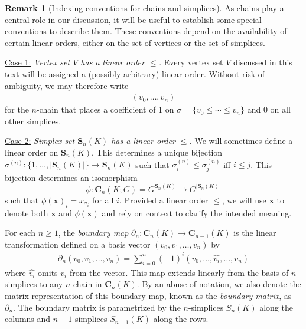 \documentclass[utf8]{formatting_stuff/frontiersFPHY}
\newcommand{\Chains}{\mathbf{C}}
\newcommand{\Simplices}[0]{\mathbf{S}}
\newcommand{\optimalrep}{\mathbf{x}}
\newcommand{\orepentry}{x}
\newcommand{\dimss}[1]{^{(#1)}}
\theoremstyle{plain}
\theoremstyle{definition}
\newtheorem{remark}[theorem]{Remark}
\begin{document}
\begin{remark}[{Indexing conventions for chains and simplices}]
\label{rmk:indexingchains}
As chains play a central role in our discussion, it will be useful to establish some special conventions to describe them.  These conventions depend on the availability of certain linear orders, either on the set of vertices or the set of simplices.

\noindent \underline{Case 1:} \emph{Vertex set $V$ has a linear order $\le$. }  Every vertex set $V$ discussed in this text will be assigned a (possibly arbitrary) linear order.  Without  risk of ambiguity, we may therefore write
    \begin{align*}
        (v_0, \ldots, v_n)
    \end{align*}
for the $n$-chain that places a coefficient of 1 on $\sigma = \{v_0 \leq \cdots \leq v_n\}$ and 0 on all other simplices. 

\noindent \underline{Case 2:} \emph{Simplex set $\Simplices_n(K)$ has a linear order $\le$.}  We will sometimes define a linear order on $\Simplices_n(K)$.  This determines a unique bijection  $\sigma \dimss{n}: \{1, \ldots, |\Simplices_n(K)|\} \to  \Simplices_n(K)$ such that $\sigma_i\dimss{n} \le \sigma_j\dimss{n}$ iff $i \le j$.  This bijection determines an isomorphism
    $$
        \phi: 
        \Chains_n(K;G) = G^{\Simplices_n(K)}
        \to
        G^{|\Simplices_n(K)|}
    $$
such that $\phi(\optimalrep)_i = \orepentry_{\sigma_i}$ for all $i$.  
Provided a linear order $\le$,  we will use $\optimalrep$ to denote both $\optimalrep$ and $\phi(\optimalrep)$ and rely on context to clarify the  intended meaning.
\end{remark}


  

For each $n\geq 1$, the \textit{boundary map} $\partial_n: \Chains_n(K) \rightarrow \Chains_{n-1}(K)$ is the linear transformation defined on a basis vector  $(v_0, v_1, \ldots, v_n)$ by 
    \begin{align*}
    \textstyle
        \partial_n(v_0, v_1, \ldots, v_n) = \sum_{i=0}^n (-1)^i (v_0, \ldots, \hat{v_i}, \ldots, v_n)
    \end{align*}
where $\hat{v_i}$ omits $v_i$ from the vector. This map extends linearly from the basis of $n$-simplices to any $n$-chain in $\Chains_n(K)$. By an abuse of notation, we also denote the matrix representation of this boundary map, known as the \textit{boundary matrix}, as $\partial_n$. The boundary matrix is parametrized by the $n$-simplices $S_n(K)$ along the columns and $n-1$-simplices $S_{n-1}(K)$ along the rows. 
\end{document}
